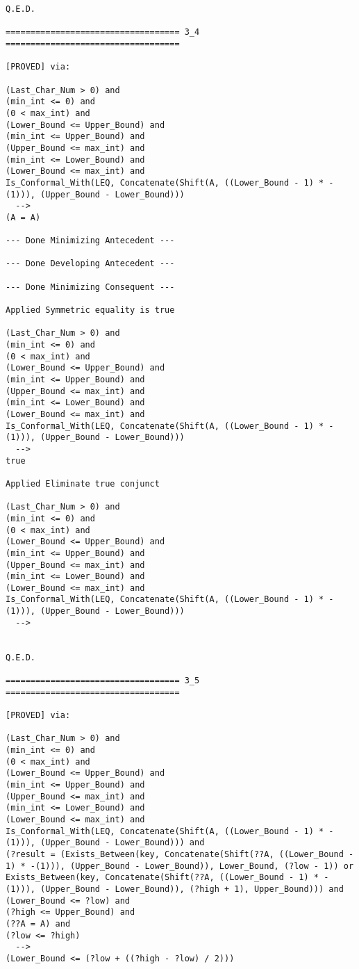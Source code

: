 \begin{lstlisting}[language=resolve]
Q.E.D.

=================================== 3_4 ===================================

[PROVED] via:

(Last_Char_Num > 0) and
(min_int <= 0) and
(0 < max_int) and
(Lower_Bound <= Upper_Bound) and
(min_int <= Upper_Bound) and
(Upper_Bound <= max_int) and
(min_int <= Lower_Bound) and
(Lower_Bound <= max_int) and
Is_Conformal_With(LEQ, Concatenate(Shift(A, ((Lower_Bound - 1) * -(1))), (Upper_Bound - Lower_Bound)))
  -->
(A = A)

--- Done Minimizing Antecedent ---

--- Done Developing Antecedent ---

--- Done Minimizing Consequent ---

Applied Symmetric equality is true

(Last_Char_Num > 0) and
(min_int <= 0) and
(0 < max_int) and
(Lower_Bound <= Upper_Bound) and
(min_int <= Upper_Bound) and
(Upper_Bound <= max_int) and
(min_int <= Lower_Bound) and
(Lower_Bound <= max_int) and
Is_Conformal_With(LEQ, Concatenate(Shift(A, ((Lower_Bound - 1) * -(1))), (Upper_Bound - Lower_Bound)))
  -->
true

Applied Eliminate true conjunct

(Last_Char_Num > 0) and
(min_int <= 0) and
(0 < max_int) and
(Lower_Bound <= Upper_Bound) and
(min_int <= Upper_Bound) and
(Upper_Bound <= max_int) and
(min_int <= Lower_Bound) and
(Lower_Bound <= max_int) and
Is_Conformal_With(LEQ, Concatenate(Shift(A, ((Lower_Bound - 1) * -(1))), (Upper_Bound - Lower_Bound)))
  -->


Q.E.D.

=================================== 3_5 ===================================

[PROVED] via:

(Last_Char_Num > 0) and
(min_int <= 0) and
(0 < max_int) and
(Lower_Bound <= Upper_Bound) and
(min_int <= Upper_Bound) and
(Upper_Bound <= max_int) and
(min_int <= Lower_Bound) and
(Lower_Bound <= max_int) and
Is_Conformal_With(LEQ, Concatenate(Shift(A, ((Lower_Bound - 1) * -(1))), (Upper_Bound - Lower_Bound))) and
(?result = (Exists_Between(key, Concatenate(Shift(??A, ((Lower_Bound - 1) * -(1))), (Upper_Bound - Lower_Bound)), Lower_Bound, (?low - 1)) or Exists_Between(key, Concatenate(Shift(??A, ((Lower_Bound - 1) * -(1))), (Upper_Bound - Lower_Bound)), (?high + 1), Upper_Bound))) and
(Lower_Bound <= ?low) and
(?high <= Upper_Bound) and
(??A = A) and
(?low <= ?high)
  -->
(Lower_Bound <= (?low + ((?high - ?low) / 2)))


\end{lstlisting}
